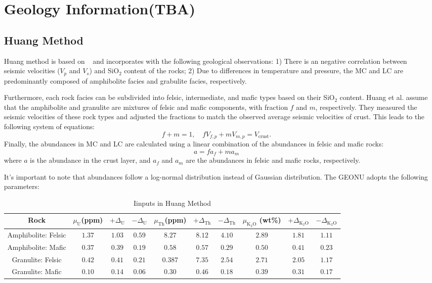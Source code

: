 	\chapter{Geology Information(TBA)}
		\section{Huang Method}
		\label{Geology: Huang Method}
			Huang method is based on ~\cite{Huang2013} and incorporates with the following geological observations: 1) There is an negative correlation between seismic velocities ($V_p$ and $V_s$) and SiO$_2$ content of the rocks; 2) Due to differences in temperature and pressure, the MC and LC are predominantly composed of amphibolite facies and grabulite facies, respectively. \par
			Furthermore, each rock facies can be subdivided into felsic, intermediate, and mafic types based on their SiO$_2$ content. Huang et al. assume that the amphibolite and granulite are mixtures of felsic and mafic components, with fraction $f$ and $m$, respectively. They measured the seismic velocities of these rock types and adjusted the fractions to match the observed average seismic velocities of crust. This leads to the following system of equations:
				\begin{equation}
					f + m = 1,
					\quad
					fV_{f, p} + mV_{m, p}
					= V_\mathrm{crust}.
				\end{equation}
			Finally, the abundances in MC and LC are calculated using a linear combination of the abundances in felsic and mafic rocks:
				\begin{equation}
					a = fa_f + ma_m
				\end{equation}
			where $a$ is the abundance in the crust layer, and $a_f$ and $a_m$ are the abundances in felsic and mafic rocks, respectively.\par
			It's important to note that abundances follow a log-normal distribution instead of Gaussian distribution. The GEONU adopts the following parameters:
				\begin{table}[H]
					\centering
					\caption{Iinputs in Huang Method}
					\begin{tabular}{c|c|c|c|c|c|c|c|c|c}
						\hline
						\hline
						Rock & $\mu_\mathrm{U}$(ppm) & $+\Delta_\mathrm{U}$ & $-\Delta_\mathrm{U}$ & $\mu_\mathrm{Th}$(ppm) & $+\Delta_\mathrm{Th}$ & $-\Delta_\mathrm{Th}$ & $\mu_\mathrm{K_2O}$ (wt\%)& $+\Delta_\mathrm{K_2O}$ & $-\Delta_\mathrm{K_2O}$\\
						\hline
						Amphibolite: Felsic & $1.37$ & $1.03$ & $0.59$ & $8.27$ & $8.12$ & $4.10$ & $2.89$ & $1.81$ & $1.11$\\
						\hline
						Amphibolite: Mafic & $0.37$ & $0.39$ & $0.19$ & $0.58$ & $0.57$ & $0.29$ & $0.50$ & $0.41$ & $0.23$\\
						\hline
						Granulite: Felsic & $0.42$ & $0.41$ & $0.21$ & $0.387$ & $7.35$ & $2.54$ & $2.71$ & $2.05$ & $1.17$\\
						\hline
						Granulite: Mafic & $0.10$ & $0.14$ & $0.06$ & $0.30$ & $0.46$ & $0.18$ & $0.39$ & $0.31$ & $0.17$\\
						\hline
						\hline
					\end{tabular}
				\end{table}

